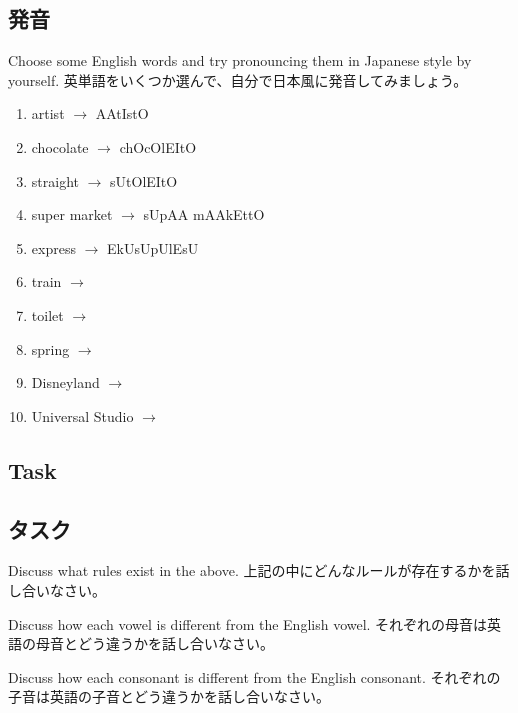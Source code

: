 \documentclass[uplatex,dvipdfmx,b5paper,english,10pt]{jsbook}
\begin{document}
\subsection{発音}
\fi

\begin{toiquestion}
\ifEnglish
Choose some English words and try pronouncing them in Japanese style by yourself.
\else
英単語をいくつか選んで、自分で日本風に発音してみましょう。
\fi
\end{toiquestion}

\begin{multicols}{2}
\begin{enumerate}
 \item artist $\rightarrow$ AAtIstO
 \item chocolate $\rightarrow$ chOcOlEItO
 \item straight $\rightarrow$ sUtOlEItO
 \item super market $\rightarrow$ sUpAA mAAkEttO
 \item express $\rightarrow$ EkUsUpUlEsU
 \item train  $\rightarrow$
 \item toilet  $\rightarrow$
 \item spring  $\rightarrow$
 \item Disneyland  $\rightarrow$
 \item Universal Studio  $\rightarrow$
\end{enumerate}
\end{multicols}


\ifEnglish
\subsection{Task}
\else
\subsection{タスク}
\fi

\begin{toiquestion}
\ifEnglish
Discuss what rules exist in the above.
\else
上記の中にどんなルールが存在するかを話し合いなさい。
\fi
\end{toiquestion}
\begin{toiquestion}
\ifEnglish
Discuss how each vowel is different from the English vowel.
\else
それぞれの母音は英語の母音とどう違うかを話し合いなさい。
\fi
\end{toiquestion}
\begin{toiquestion}
\ifEnglish
Discuss how each consonant is different from the English consonant.
\else
それぞれの子音は英語の子音とどう違うかを話し合いなさい。
\fi
\end{toiquestion}
\end{document}
